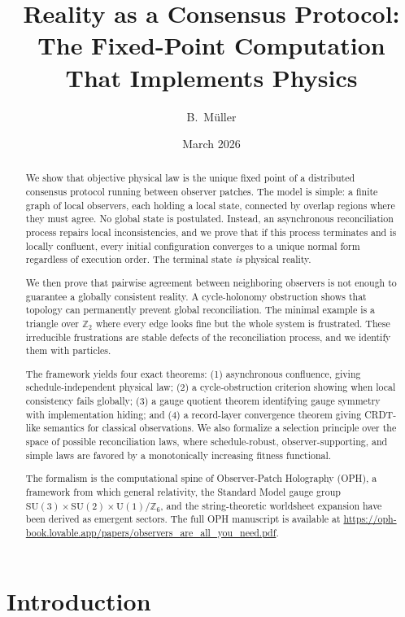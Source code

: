 \documentclass[11pt]{article}
\title{Reality as a Consensus Protocol:\\
The Fixed-Point Computation That Implements Physics}
\author{B.\ M\"uller}
\date{March 2026}
\begin{document}
\maketitle

\begin{abstract}
We show that objective physical law is the unique fixed point of a distributed consensus protocol running between observer patches. The model is simple: a finite graph of local observers, each holding a local state, connected by overlap regions where they must agree. No global state is postulated. Instead, an asynchronous reconciliation process repairs local inconsistencies, and we prove that if this process terminates and is locally confluent, every initial configuration converges to a unique normal form regardless of execution order. The terminal state \emph{is} physical reality.

We then prove that pairwise agreement between neighboring observers is not enough to guarantee a globally consistent reality. A cycle-holonomy obstruction shows that topology can permanently prevent global reconciliation. The minimal example is a triangle over $\mathbb{Z}_2$ where every edge looks fine but the whole system is frustrated. These irreducible frustrations are stable defects of the reconciliation process, and we identify them with particles.

The framework yields four exact theorems: (1) asynchronous confluence, giving schedule-independent physical law; (2) a cycle-obstruction criterion showing when local consistency fails globally; (3) a gauge quotient theorem identifying gauge symmetry with implementation hiding; and (4) a record-layer convergence theorem giving CRDT-like semantics for classical observations. We also formalize a selection principle over the space of possible reconciliation laws, where schedule-robust, observer-supporting, and simple laws are favored by a monotonically increasing fitness functional.

The formalism is the computational spine of Observer-Patch Holography (OPH), a framework from which general relativity, the Standard Model gauge group $\mathrm{SU}(3)\times\mathrm{SU}(2)\times\mathrm{U}(1)/\mathbb{Z}_6$, and the string-theoretic worldsheet expansion have been derived as emergent sectors. The full OPH manuscript is available at \url{https://oph-book.lovable.app/papers/observers_are_all_you_need.pdf}.
\end{abstract}

\section{Introduction}
\end{document}
